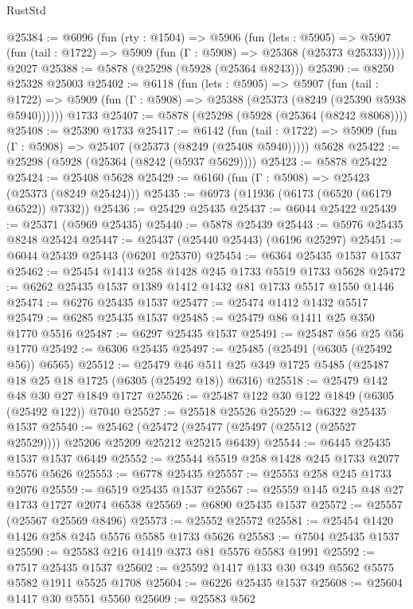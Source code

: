 \begin{lexlean}{RustStd}
\begin{coremodule}
@25384 := @6096
    (fun (rty : @1504) =>
    @5906
      (fun (lets : @5905) =>
      @5907 (fun (tail : @1722) => @5909 (fun (Γ : @5908) => @25368 (@25373 @25333)))))
    @2027
@25388 := @5878 (@25298 (@5928 (@25364 @8243)))
@25390 := @8250 @25328 @25003
@25402 := @6118
    (fun (lets : @5905) =>
    @5907
      (fun (tail : @1722) =>
      @5909 (fun (Γ : @5908) => @25388 (@25373 (@8249 (@25390 @5938 @5940))))))
    @1733
@25407 := @5878 (@25298 (@5928 (@25364 (@8242 @8068))))
@25408 := @25390 @1733
@25417 := @6142
    (fun (tail : @1722) => @5909 (fun (Γ : @5908) => @25407 (@25373 (@8249 (@25408 @5940)))))
    @5628
@25422 := @25298 (@5928 (@25364 (@8242 (@5937 @5629))))
@25423 := @5878 @25422
@25424 := @25408 @5628
@25429 := @6160 (fun (Γ : @5908) => @25423 (@25373 (@8249 @25424)))
@25435 := @6973 (@11936 (@6173 (@6520 (@6179 @6522)) @7332))
@25436 := @25429 @25435
@25437 := @6044 @25422
@25439 := @25371 (@5969 @25435)
@25440 := @5878 @25439
@25443 := @5976 @25435 @8248 @25424
@25447 := @25437 (@25440 @25443) (@6196 @25297)
@25451 := @6044 @25439 @25443 (@6201 @25370)
@25454 := @6364 @25435 @1537 @1537
@25462 := @25454 @1413 @258 @1428 @245 @1733 @5519 @1733 @5628
@25472 := @6262 @25435 @1537 @1389 @1412 @1432 @81 @1733 @5517 @1550 @1446
@25474 := @6276 @25435 @1537
@25477 := @25474 @1412 @1432 @5517
@25479 := @6285 @25435 @1537
@25485 := @25479 @86 @1411 @25 @350 @1770 @5516
@25487 := @6297 @25435 @1537
@25491 := @25487 @56 @25 @56 @1770
@25492 := @6306 @25435
@25497 := @25485 (@25491 (@6305 (@25492 @56)) @6565)
@25512 := @25479 @46 @511 @25 @349 @1725 @5485 (@25487 @18 @25 @18 @1725 (@6305 (@25492 @18)) @6316)
@25518 := @25479 @142 @48 @30 @27 @1849 @1727
@25526 := @25487 @122 @30 @122 @1849 (@6305 (@25492 @122)) @7040
@25527 := @25518 @25526
@25529 := @6322 @25435 @1537
@25540 := @25462
    (@25472 (@25477 (@25497 (@25512 (@25527 @25529)))) @25206 @25209 @25212 @25215 @6439)
@25544 := @6445 @25435 @1537 @1537 @6449
@25552 := @25544 @5519 @258 @1428 @245 @1733 @2077 @5576 @5626
@25553 := @6778 @25435
@25557 := @25553 @258 @245 @1733 @2076
@25559 := @6519 @25435 @1537
@25567 := @25559 @145 @245 @48 @27 @1733 @1727 @2074 @6538
@25569 := @6890 @25435 @1537
@25572 := @25557 (@25567 @25569 @8496)
@25573 := @25552 @25572
@25581 := @25454 @1420 @1426 @258 @245 @5576 @5585 @1733 @5626
@25583 := @7504 @25435 @1537
@25590 := @25583 @216 @1419 @373 @81 @5576 @5583 @1991
@25592 := @7517 @25435 @1537
@25602 := @25592 @1417 @133 @30 @349 @5562 @5575 @5582 @1911 @5525 @1708
@25604 := @6226 @25435 @1537
@25608 := @25604 @1417 @30 @5551 @5560
@25609 := @25583 @562

\end{coremodule}
\end{lexlean}
